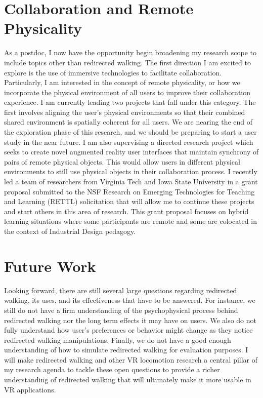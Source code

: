 \section*{Collaboration and Remote Physicality}
\vspace{-0.5cm}
As a postdoc, I now have the opportunity begin broadening my research scope to include topics other than redirected walking. The first direction I am excited to explore is the use of immersive technologies to facilitate collaboration. Particularly, I am interested in the concept of remote physicality, or how we incorporate the physical environment of all users to improve their collaboration experience. I am currently leading two projects that fall under this category. The first involves aligning the user's physical environments so that their combined shared environment is spatially coherent for all users. We are nearing the end of the exploration phase of this research, and we should be preparing to start a user study in the near future. I am also supervising a directed research project which seeks to create novel augmented reality user interfaces that maintain synchrony of pairs of remote physical objects. This would allow users in different physical environments to still use physical objects in their collaboration process. I recently led a team of researchers from Virginia Tech and Iowa State University in a grant proposal submitted to the NSF Research on Emerging Technologies for Teaching and Learning (RETTL) solicitation that will allow me to continue these projects and start others in this area of research. This grant proposal focuses on hybrid learning situations where some participants are remote and some are colocated in the context of Industrial Design pedagogy.


\section*{Future Work}
\vspace{-0.5cm}
Looking forward, there are still several large questions regarding redirected walking, its uses, and its effectiveness that have to be answered. For instance, we still do not have a firm understanding of the psychophysical process behind redirected walking nor the long term effects it may have on users. We also do not fully understand how user's preferences or behavior might change as they notice redirected walking manipulations. Finally, we do not have a good enough understanding of how to simulate redirected walking for evaluation purposes. I will make redirected walking and other VR locomotion research a central pillar of my research agenda to tackle these open questions to provide a richer understanding of redirected walking that will ultimately make it more usable in VR applications.

